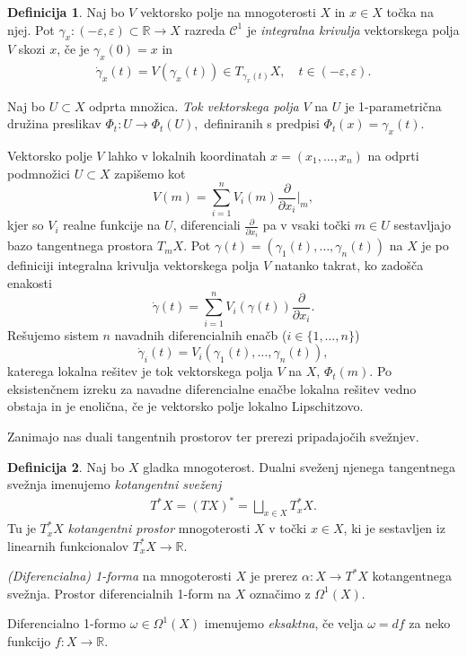 \documentclass[12pt,a4paper,twoside]{article}
\theoremstyle{definition} %
\newtheorem{definicija}{Definicija}[section]
\theoremstyle{plain} %
\numberwithin{equation}{section}  %
\newcommand{\R}{\mathbb R}
\begin{document}
\begin{definicija}
Naj bo $V$ vektorsko polje na mnogoterosti $X$ in $x \in X$ točka na njej. Pot $\gamma_{x} \colon (-\varepsilon, \varepsilon) \subset \R \to X$ razreda $\mathcal{C}^{1}$ je \emph{integralna krivulja} vektorskega polja $V$ skozi $x$, če je $\gamma_{x}(0) = x$ in
\begin{gather}
\dot{\gamma}_{x} (t) = V(\gamma _{x}(t)) \in T_{\gamma _{x}(t)}X, \quad t \in (-\varepsilon, \varepsilon).
\end{gather}

Naj bo $U \subset X$ odprta množica. \emph{Tok vektorskega polja} $V$ na $U$ je 1-parametrična družina preslikav
$ \Phi_{t} \colon U \to \Phi_{t}(U),$ definiranih s predpisi $\Phi_{t}(x) = \gamma_{x}(t)$.
\end{definicija}

Vektorsko polje $V$ lahko v lokalnih koordinatah $x = (x_{1}, \dots, x_{n})$ na odprti podmnožici $U \subset X$ zapišemo kot 
\begin{equation}
V(m) = \sum_{i=1}^{n} V_{i}(m) \frac{\partial}{\partial x_{i}} \Big|_{m},
\end{equation}
kjer so $V_{i}$ realne funkcije na $U$, diferenciali $\frac{\partial}{\partial x_{i}}$ pa v vsaki točki $m \in U$ sestavljajo bazo tangentnega prostora $T_{m}X$.
Pot $\gamma (t) = (\gamma_{1}(t), \dots, \gamma_{n}(t))$ na $X$ je po definiciji integralna krivulja vektorskega polja $V$ natanko takrat, ko zadošča enakosti 
\begin{equation*}
\dot{\gamma}(t) = \sum_{i=1}^{n} V_{i}(\gamma(t)) \frac{\partial}{\partial x_{i}}.
\end{equation*}
Rešujemo sistem $n$ navadnih diferencialnih enačb ($i \in \{ 1, \dots , n \}$)
\begin{equation*}
\dot{\gamma}_{i}(t) = V_{i}(\gamma_{1}(t), \dots, \gamma_{n}(t)),
\end{equation*}
katerega lokalna rešitev je tok vektorskega polja $V$ na $X$, $\Phi_{t}(m)$. Po eksistenčnem izreku za navadne diferencialne enačbe lokalna rešitev vedno obstaja in je enolična, če je vektorsko polje lokalno Lipschitzovo.

Zanimajo nas duali tangentnih prostorov ter prerezi pripadajočih svežnjev.

\begin{definicija}
Naj bo $X$ gladka mnogoterost. Dualni sveženj njenega tangentnega svežnja imenujemo \emph{kotangentni sveženj}
\begin{align}
T^{*}X = (TX)^{*} = \bigsqcup_{x \in X} T_{x}^{*}X.
\end{align}
Tu je $T_{x}^{*}X$ \emph{kotangentni prostor} mnogoterosti $X$ v točki $x \in X$, ki je sestavljen iz linearnih funkcionalov $T_{x}^{*}X \to \R$.

\emph{(Diferencialna) 1-forma} na mnogoterosti $X$ je prerez $\alpha \colon X \to T^{*}X$ kotangentnega svežnja. Prostor diferencialnih 1-form na $X$ označimo z $\Omega ^{1}(X)$.

Diferencialno 1-formo $\omega \in \Omega ^{1}(X)$ imenujemo \emph{eksaktna}, če velja $\omega = df$ za neko funkcijo $f \colon X \to \mathbb{R}$.
\end{definicija}
\end{document}
